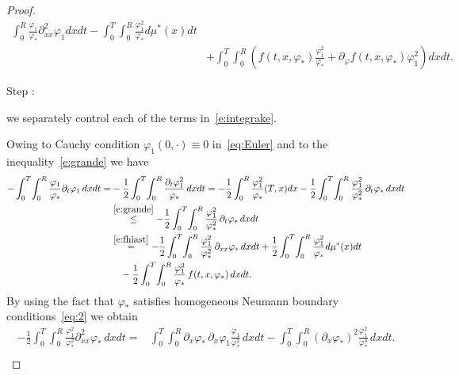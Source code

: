 \documentclass[11pt,leqno]{amsart}
\newcounter{stepnb}
\numberwithin{equation}{section}
\begin{document}
\begin{proof}
\begin{equation}
\begin{split}
    \int_0^R \!\frac{{\varphi}_1 }{{\varphi}_\ast} {\partial_{xx}^2}{\varphi}_1 dx dt - \int_0^T \!
    \int_0^R \!
    \frac{{\varphi}_1^2}{{\varphi}_\ast} d \mu^\ast (x ) dt
    \\
    & + \int_0^T \!  \int_0^R \left(
      f(t,x,{\varphi}_\ast)\frac{{\varphi}_1^2}{{\varphi}_\ast} +{\partial}_{\varphi}
      f(t,x,{\varphi}_\ast){\varphi}_1^2
    \right) dx dt.
  \end{split}
\end{equation}
{{{\sc \addtocounter{stepnb}{1}\noindent  Step :} {we separately control each of the terms in~\eqref{e:integrake}}.}}
Owing to Cauchy condition ${\varphi}_1 (0, \cdot) \equiv 0$ in~\eqref{eq:Euler} and to the inequality~\eqref{e:grande} we have 
\begin{equation}
\label{e:inte1}
\begin{split}
     - \int_0^T \!
\int_0^R   \frac{{\varphi}_1}{{\varphi}_\ast}{\partial_t}{\varphi}_1 \, dx dt = & 
- \frac{1}{2} \int_0^T \!
\int_0^R    \frac{{\partial_t} {\varphi}_1^2}{{\varphi}_\ast} \, dx dt =
- \frac{1}{2} \int_0^R  \frac{{\varphi}_1^2}{{\varphi}_\ast} (T, x) dx -
 \frac{1}{2} \int_0^T \!
\int_0^R  \frac{{\varphi}_1^2 }{{\varphi}_\ast^2} \, {\partial_t} {\varphi}_\ast \, dx dt \\
& \stackrel{\eqref{e:grande}}{\leq} - \frac{1}{2} \int_0^T \!
\int_0^R  \frac{{\varphi}_1^2 }{{\varphi}_\ast^2} \, {\partial_t} {\varphi}_\ast \, dx dt  \\
& \stackrel{\eqref{e:fhiast}}{=}
- \frac{1}{2} \int_0^T \!
\int_0^R  \frac{{\varphi}_1^2 }{{\varphi}_\ast^2}
\, \partial_{xx} {\varphi}_\ast \, dx dt +
\frac{1}{2} \int_0^T \!
\int_0^R  \frac{{\varphi}_1^2 }{{\varphi}_\ast}
 d \mu^\ast (x) dt \\ & \quad -
 \frac{1}{2}
  \int_0^T \!
\int_0^R  \frac{{\varphi}_1^2 }{{\varphi}_\ast}
\, f(t, x, {\varphi}_\ast)  \, dx dt.
\end{split}
\end{equation}
By using the fact that ${\varphi}_\ast$ satisfies homogeneous Neumann boundary conditions~\eqref{eq:2} we obtain
\begin{equation}
\label{e:inte3}
\begin{split}
     - \frac{1}{2} \int_0^T \!
\int_0^R  \frac{{\varphi}_1^2}{{\varphi}_\ast^2}{\partial_{xx}^2}{\varphi}_\ast \, dx dt = & 
 \int_0^T \!
\int_0^R   {\partial_x } {\varphi}_\ast \, {\partial_x } {\varphi}_1  \frac{{\varphi}_1}{{\varphi}^2_\ast} \, dx dt 
-  \int_0^T \! \int_0^R ( {\partial_x } {\varphi}_\ast)^2  \frac{{\varphi}_1^2}{{\varphi}^3_\ast}  \, dx dt . \\ 

\end{split}
\end{equation}
\end{proof}
\end{document}
